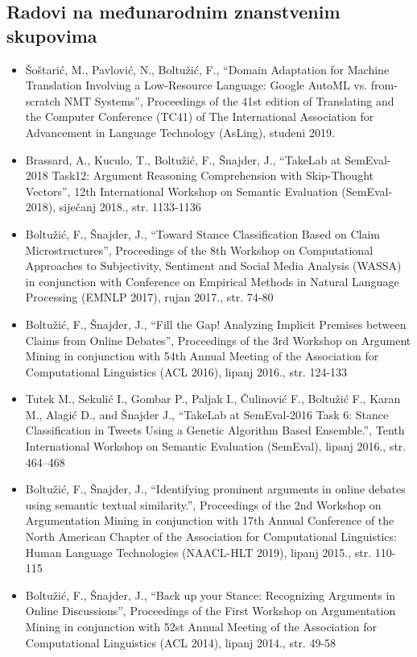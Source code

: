 \subsection*{Radovi na međunarodnim znanstvenim skupovima}

\begin{itemize}

\item Šoštarić, M., Pavlović, N., Boltužić, F., 
``Domain Adaptation for Machine Translation Involving a Low-Resource Language:
Google AutoML vs. from-scratch NMT Systems'',
Proceedings of the 
41st edition of Translating and the Computer Conference (TC41)
of The International Association for Advancement in Language Technology
(AsLing), studeni 2019.
\item Brassard, A., Kuculo, T., Boltužić, F., Šnajder, J., 
``TakeLab at SemEval-2018 Task12: Argument Reasoning Comprehension with Skip-Thought Vectors'',
12th International Workshop on Semantic Evaluation (SemEval-2018),
siječanj 2018., str. 1133-1136
\item Boltužić, F., Šnajder, J., 
``Toward Stance Classification Based on Claim Microstructures'',
Proceedings of the 8th Workshop on Computational Approaches to Subjectivity,
Sentiment and Social Media Analysis (WASSA) in conjunction with 
Conference on Empirical Methods in Natural Language Processing (EMNLP 2017),
rujan 2017., str. 74-80
\item Boltužić, F., Šnajder, J., 
``Fill the Gap! Analyzing Implicit Premises between Claims from Online Debates'',
Proceedings of the 3rd Workshop on Argument Mining in conjunction 
with 54th Annual Meeting of the Association for Computational Linguistics (ACL 2016),
lipanj 2016., str. 124-133
\item Tutek M., Sekulić I., Gombar P., Paljak I., Čulinović F., Boltužić
F., Karan M., Alagić D., and Šnajder J., ``TakeLab at
SemEval-2016 Task 6: Stance Classification in Tweets Using a
Genetic Algorithm Based Ensemble.'', Tenth International
Workshop on Semantic Evaluation (SemEval), lipanj 2016., str. 464–468
\item Boltužić, F., Šnajder, J.,
``Identifying prominent arguments in online debates using semantic textual similarity.'',
Proceedings of the 2nd Workshop on Argumentation Mining in conjunction
with 17th Annual Conference of the North American Chapter of the Association for
Computational Linguistics: Human Language Technologies
(NAACL-HLT 2019), lipanj 2015., str. 110-115
\item Boltužić, F., Šnajder, J., 
``Back up your Stance: Recognizing Arguments in Online Discussions'', 
Proceedings of the First Workshop on Argumentation Mining 
in conjunction with 52st Annual Meeting of the Association for Computational Linguistics (ACL 2014),
lipanj 2014., str. 49-58
\end{itemize}
